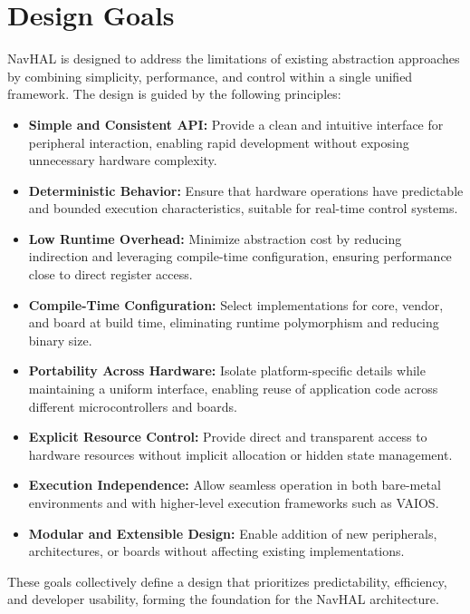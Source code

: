 \section{Design Goals}
\label{sec:navhal_design_goals}

NavHAL is designed to address the limitations of existing abstraction approaches by combining simplicity, performance, and control within a single unified framework. The design is guided by the following principles:

\begin{itemize}

    \item \textbf{Simple and Consistent API:}  
    Provide a clean and intuitive interface for peripheral interaction, enabling rapid development without exposing unnecessary hardware complexity.

    \item \textbf{Deterministic Behavior:}  
    Ensure that hardware operations have predictable and bounded execution characteristics, suitable for real-time control systems.

    \item \textbf{Low Runtime Overhead:}  
    Minimize abstraction cost by reducing indirection and leveraging compile-time configuration, ensuring performance close to direct register access.

    \item \textbf{Compile-Time Configuration:}  
    Select implementations for core, vendor, and board at build time, eliminating runtime polymorphism and reducing binary size.

    \item \textbf{Portability Across Hardware:}  
    Isolate platform-specific details while maintaining a uniform interface, enabling reuse of application code across different microcontrollers and boards.

    \item \textbf{Explicit Resource Control:}  
    Provide direct and transparent access to hardware resources without implicit allocation or hidden state management.

    \item \textbf{Execution Independence:}  
    Allow seamless operation in both bare-metal environments and with higher-level execution frameworks such as VAIOS.

    \item \textbf{Modular and Extensible Design:}  
    Enable addition of new peripherals, architectures, or boards without affecting existing implementations.

\end{itemize}

These goals collectively define a design that prioritizes predictability, efficiency, and developer usability, forming the foundation for the NavHAL architecture.